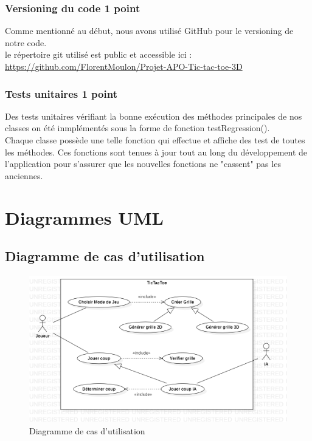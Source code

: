 \documentclass{article}
\begin{document}
\subsubsection{Versioning du code \hfill 1 point}
Comme mentionné au début, nous avons utilisé GitHub pour le versioning de notre code.\\
le répertoire git utilisé est public et accessible ici : \\ \href{https://github.com/FlorentMoulon/Projet-APO-Tic-tac-toe-3D}{https://github.com/FlorentMoulon/Projet-APO-Tic-tac-toe-3D}\\

\subsubsection{Tests unitaires \hfill 1 point}
Des tests unitaires vérifiant la bonne exécution des méthodes principales de nos classes on été inmplémentés sous la forme de fonction testRegression().\\
Chaque classe possède une telle fonction qui effectue et affiche des test de toutes les méthodes. Ces fonctions sont tenues à jour tout au long du développement de l'application pour s'assurer que les nouvelles fonctions ne "cassent" pas les anciennes.\\

\newpage

\section{Diagrammes UML}

\subsection{Diagramme de cas d'utilisation}
\begin{figure}[h]
    \centering
    \includegraphics[scale=0.5]{Diagramme UML/Diagramme cas d'utilisation.png}
    \caption{Diagramme de cas d'utilisation}
    \label{fig:Diagramme de cas d'utilisation}
\end{figure}
\end{document}
